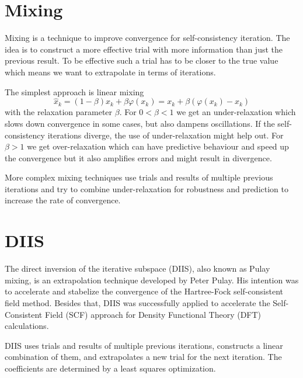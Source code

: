 \section{Mixing}
Mixing is a technique to improve convergence for self-consistency iteration. The idea is to construct a more effective trial with more information than just the previous result. To be effective such a trial has to be closer to the true value which means we want to extrapolate in terms of iterations.

The simplest approach is linear mixing
\begin{equation} \label{eq:linmix}
\hat{x}_k = (1-\beta) x_k + \beta \varphi(x_k) = x_k + \beta (\varphi(x_k) - x_k)
\end{equation}
with the relaxation parameter \(\beta\).
For \(0 < \beta < 1\) we get an under-relaxation which slows down convergence in some cases, but also dampens oscillations. If the self-consistency iterations diverge, the use of under-relaxation might help out.
For \(\beta > 1\) we get over-relaxation which can have predictive behaviour and speed up the convergence but it also amplifies errors and might result in divergence.

More complex mixing techniques use trials and results of multiple previous iterations and try to combine under-relaxation for robustness and prediction to increase the rate of convergence.

\section{DIIS}
The direct inversion of the iterative subspace (DIIS), also known as Pulay mixing, is an extrapolation technique developed by Peter Pulay. His intention was to accelerate and stabelize the convergence of the Hartree-Fock self-consistent field method.\cite{diis_pulay1}\cite{diis_pulay2} Besides that, DIIS was successfully applied to accelerate the Self-Consistent Field (SCF) approach for Density Functional Theory (DFT) calculations.\cite{diis_restarted}

DIIS uses trials and results of multiple previous iterations, constructs a linear combination of them, and extrapolates a new trial for the next iteration. The coefficients are determined by a least squares optimization.

